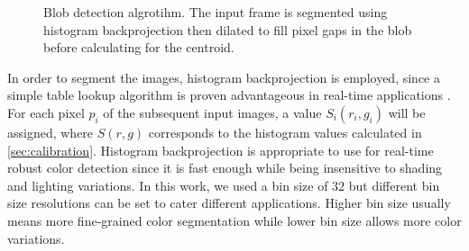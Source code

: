 \documentclass[10pt,a4paper,twoside]{article}
\begin{document}
\begin{figure}[b!]
    \centering
    \quad %
    \quad %
    \quad %
    \quad %

  \caption{Blob detection algrotihm. The input frame is segmented using histogram backprojection then dilated to fill pixel gaps in the blob before calculating for the centroid.}\label{fig:blob-detection}
\end{figure}


In order to segment the images, histogram backprojection is employed, since a simple table lookup algorithm is proven advantageous in real-time applications \cite{soriano_adaptive_2003}. For each pixel $p_{i}$ of the subsequent input images, a value $S_{i}(r_{i}, g_{i})$  will be assigned, where  $S(r,g)$ corresponds to the histogram values calculated in \ref{sec:calibration}. Histogram backprojection is appropriate to use for real-time robust color detection since it is fast enough while being insensitive to shading and lighting variations. In this work, we used a bin size of $32$ but different bin size resolutions can be set to cater different applications. Higher bin size usually means more fine-grained color segmentation while lower bin size allows more color variations.
\end{document}
